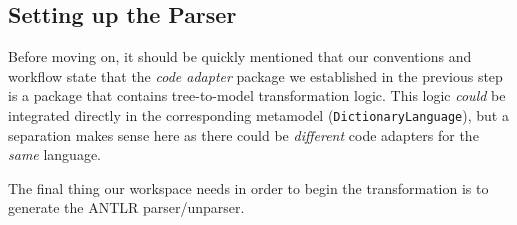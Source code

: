 \newpage
\hypertarget{subSec:setupParser}{}
\subsection{Setting up the Parser}
\genHeader

Before moving on, it should be quickly mentioned that our conventions and workflow state that the \emph{code adapter} package we established in the
previous step is a package that contains tree-to-model transformation logic. This logic \emph{could} be integrated directly in the corresponding metamodel
(\texttt{Dic\-tion\-ary\-Language}), but a separation makes sense here as there could be \emph{different} code adapters for the \emph{same} language.

The final thing our workspace needs in order to begin the transformation is to generate the ANTLR parser/unparser.

